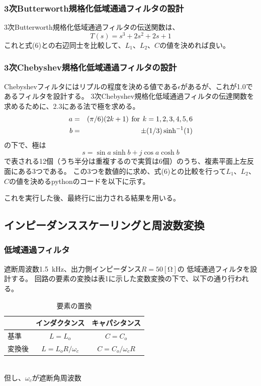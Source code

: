 \documentclass[10pt,a4j,dvipdfmx]{jsarticle}
\makeatletter
\let\@oldsubsec\subsection
\renewcommand{\subsection}[1]{\vspace{-7pt}\@oldsubsec{#1}}
\makeatother
\begin{document}
\subsubsection{3次Butterworth規格化低域通過フィルタの設計}
3次Butterworth規格化低域通過フィルタの伝送関数は、
\begin{equation}
T(s)  = s^3 + 2s^2 + 2s + 1
\end{equation}
これと式(6)との右辺同士を比較して、$L_1$、$L_2$、$C$の値を決めれば良い。

\subsubsection{3次Chebyshev規格化低域通過フィルタの設計}
Chebyshevフィルタにはリプルの程度を決める値である$\epsilon$があるが、これが1.0であるフィルタを設計する。
3次Chebyshev規格化低域通過フィルタの伝達関数を求めるために、2.3にある法で極を求める。
\begin{eqnarray}
a &=& (\pi/6)(2k+1) \hspace{4pt} {\rm for}\hspace{4pt} k = 1, 2, 3, 4, 5, 6  \\
b &=& \pm (1/3)\sinh^{-1}(1)\\
\end{eqnarray}
の下で、極は
\begin{equation}
s = \sin a \sinh b + j \cos a \cosh b
\end{equation}
で表される12個（うち半分は重複するので実質は6個）のうち、複素平面上左反面にある3つである。
この3つを数値的に求め、式(6)との比較を行って$L_1$、$L_2$、$C$の値を決めるpythonのコードを以下に示す。

これを実行した後、最終行に出力される結果を用いる。

\subsection{インピーダンススケーリングと周波数変換}
\subsubsection{低域通過フィルタ}
遮断周波数\SI{1.5}{\kilo\hertz}、出力側インピーダンス$R = 50[\si{\ohm}]$の
低域通過フィルタを設計する。
回路の要素の変換は表1に示した変数変換の下で、以下の通り行われる。

\begin{table}[htb]
  \begin{center}
    \caption{要素の置換}
    \begin{tabular}{|l||c|c|} \hline
       & インダクタンス & キャパシタンス\\ \hline \hline
      基準 & $L=L_o$ & $C=C_o$ \\
      変換後 & $L=L_oR/\omega_c$ & $C=C_o/\omega_cR$ \\ \hline
    \end{tabular}
    \\ 但し、$\omega_c$が遮断角周波数
  \end{center}
\end{table}
\end{document}
